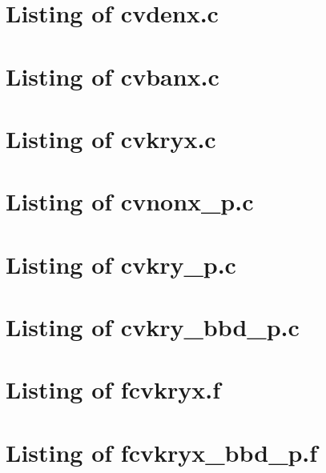 
\newpage
\section{Listing of cvdenx.c}\label{s:cvdenx_c}

\newpage
\section{Listing of cvbanx.c}\label{s:cvbanx_c}

\newpage
\section{Listing of cvkryx.c}\label{s:cvkryx_c}


\newpage
\section{Listing of cvnonx\_p.c}\label{s:cvnonx_p_c}

\newpage
\section{Listing of cvkry\_p.c}\label{s:cvkry_p_c}

\newpage
\section{Listing of cvkry\_bbd\_p.c}\label{s:cvkry_bbd_p_c}


\newpage
\section{Listing of fcvkryx.f}\label{s:fcvkryx_f}

\newpage
\section{Listing of fcvkryx\_bbd\_p.f}\label{s:fcvkryx_bbd_p_f}


